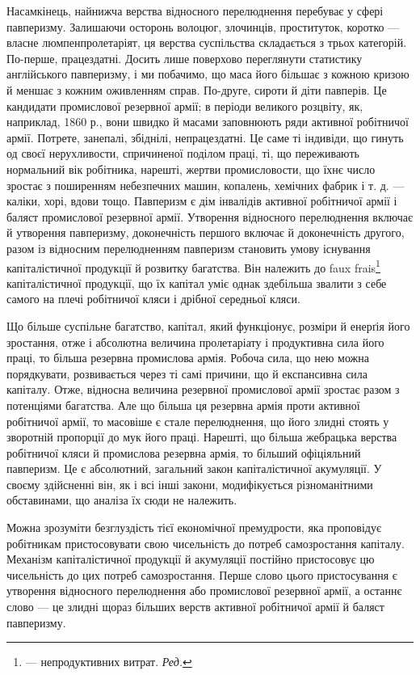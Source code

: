 Насамкінець, найнижча верства відносного перелюднення
перебуває у сфері павперизму. Залишаючи осторонь волоцюг,
злочинців, проституток, коротко — власне люмпенпролетаріят,
ця верства суспільства складається з трьох категорій. По-перше,
працездатні. Досить лише поверхово переглянути статистику
англійського павперизму, і ми побачимо, що маса його більшає
з кожною кризою й меншає з кожним оживленням справ. По-друге,
сироти й діти павперів. Це кандидати промислової резервної
армії; в періоди великого розцвіту, як, наприклад, 1860 р., вони
швидко й масами заповнюють ряди активної робітничої армії.
Потрете, занепалі, збіднілі, непрацездатні. Це саме ті індивіди,
що гинуть од своєї нерухливости, спричиненої поділом праці,
ті, що переживають нормальний вік робітника, нарешті, жертви
промисловости, що їхнє число зростає з поширенням небезпечних
машин, копалень, хемічних фабрик і т. д. — каліки, хорі,
вдови тощо. Павперизм є дім інвалідів активної робітничої армії
і баляст промислової резервної армії. Утворення відносного
перелюднення включає й утворення павперизму, доконечність
першого включає й доконечність другого, разом із відносним
перелюдненням павперизм становить умову існування капіталістичної
продукції й розвитку багатства. Він належить до faux
frais\footnote*{
— непродуктивних витрат. \emph{Ред.}
} капіталістичної продукції, що їх капітал уміє однак здебільша
звалити з себе самого на плечі робітничої кляси і дрібної
середньої кляси.

Що більше суспільне багатство, капітал, який функціонує,
розміри й енерґія його зростання, отже і абсолютна величина пролетаріату
і продуктивна сила його праці, то більша резервна промислова
армія. Робоча сила, що нею можна порядкувати, розвивається
через ті самі причини, що й експансивна сила капіталу.
Отже, відносна величина резервної промислової армії зростає
разом з потенціями багатства. Але що більша ця резервна армія
проти активної робітничої армії, то масовіше є стале перелюднення,
що його злидні стоять у зворотній пропорції до мук його
праці. Нарешті, що більша жебрацька верства робітничої кляси
й промислова резервна армія, то більший офіціяльний павперизм.
Це є абсолютний, загальний закон капіталістичної акумуляції.
У своєму здійсненні він, як і всі інші закони, модифікується
різноманітними обставинами, що аналіза їх сюди не
належить.

Можна зрозуміти безглуздість тієї економічної премудрости,
яка проповідує робітникам пристосовувати свою чисельність до
потреб самозростання капіталу. Механізм капіталістичної продукції
й акумуляції постійно пристосовує цю чисельність до цих
потреб самозростання. Перше слово цього пристосування є утворення
відносного перелюднення або промислової резервної армії,
а останнє слово — це злидні щораз більших верств активної
робітничої армії й баляст павперизму.
